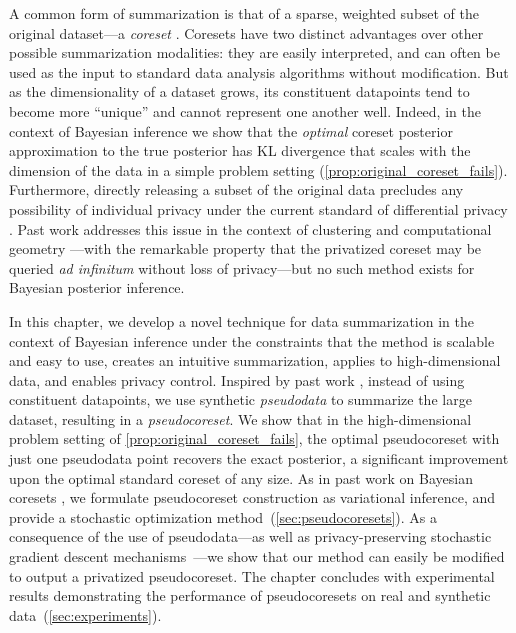 A common form of summarization is that of a sparse, weighted subset of the original dataset---a \emph{coreset} \citep{agarwal05}. 
Coresets have two distinct advantages over other possible summarization modalities: they are easily interpreted, and can often be used
as the input to standard data analysis algorithms without modification. 
But as the dimensionality of a dataset grows, its constituent 
datapoints tend to become more ``unique'' and cannot represent one another well. Indeed, in the context of Bayesian inference we show that the \emph{optimal} coreset posterior approximation to the true posterior has KL divergence that scales with the dimension 
of the data in a simple problem setting (\cref{prop:original_coreset_fails}). 
Furthermore, directly releasing a subset of the original data precludes any possibility of
individual privacy under the current standard 
of differential privacy \citep{dwork2006calibrating,dwork14}. Past work
addresses this issue in the context of clustering and computational geometry \citep{feldman09,feldman17}---with
the remarkable property that the privatized coreset may be queried \emph{ad infinitum} without
loss of privacy---but no such method exists for Bayesian posterior inference.

In this chapter, we develop a novel technique for data summarization in the context of Bayesian inference under the constraints that the method 
is scalable and easy to use, creates an intuitive summarization, applies to high-dimensional data, and enables privacy control.
Inspired by past work \citep{madigan02,zhou08,snelson05}, instead of using constituent datapoints, we use synthetic \emph{pseudodata} to summarize the large dataset, resulting in a \emph{pseudocoreset}. We show that in the high-dimensional problem setting of \cref{prop:original_coreset_fails}, 
the optimal pseudocoreset with just one pseudodata point recovers the exact posterior, a significant improvement upon the optimal standard coreset of any size.
As in past work on Bayesian coresets \citep{campbell19neurips}, we formulate pseudocoreset construction as variational inference, 
and provide a stochastic optimization method~(\cref{sec:pseudocoresets}). As a consequence of the use of pseudodata---as well as privacy-preserving 
stochastic gradient descent mechanisms~\citep{abadi16,park16, jalko17}---we show that our method can easily be modified to output
a privatized pseudocoreset. The chapter concludes with experimental results demonstrating the performance of pseudocoresets on 
real and synthetic data~(\cref{sec:experiments}).
